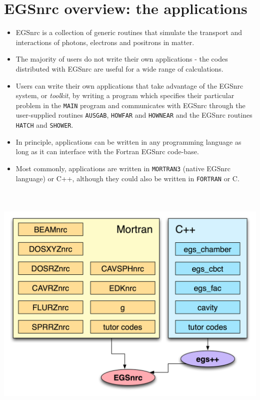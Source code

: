 \documentclass[12pt,twoside]{article}
\begin{document}
\clearpage
\section{EGSnrc overview: the applications}
\label{apps}


\begin{itemize}
\item EGSnrc is a collection of generic routines that simulate the transport
and interactions of photons, electrons and positrons in matter.
\item The majority of users do not write their own applications - the codes distributed
with EGSnrc are useful for a wide range of calculations.
\item Users can write their own applications that take advantage of the EGSnrc
system, or \textit{toolkit}, by writing a program which specifies their
particular problem in the \Verb+MAIN+ program and communicates with EGSnrc
through the user-supplied routines \Verb+AUSGAB+, \Verb+HOWFAR+ and \Verb+HOWNEAR+
and the EGSnrc routines \Verb+HATCH+ and \Verb+SHOWER+.
\item In principle, applications can be written in any programming language as
long as it can interface with the Fortran EGSnrc code-base.
\item Most commonly, applications are written in \Verb+MORTRAN3+ (native EGSnrc
language) or C++, although they could also be written in \Verb+FORTRAN+ or C.
\end{itemize}

\begin{center}
\includegraphics[height=340pt]{figures/egsApplications}
\end{center}
\end{document}
